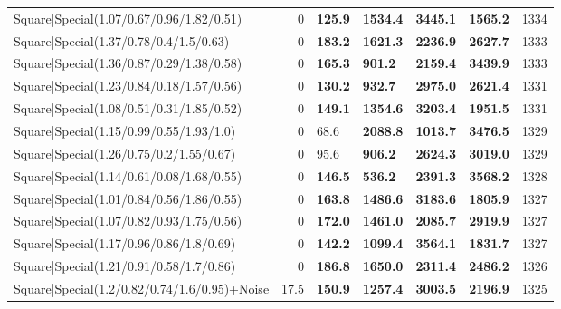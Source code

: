 \begin{tabular}{lrllllr}
 Square|Special(1.07/0.67/0.96/1.82/0.51)                      &             0   & \textbf{125.9} & \textbf{1534.4} & \textbf{3445.1} & \textbf{1565.2} &         1334 \\
 Square|Special(1.37/0.78/0.4/1.5/0.63)                        &             0   & \textbf{183.2} & \textbf{1621.3} & \textbf{2236.9} & \textbf{2627.7} &         1333 \\
 Square|Special(1.36/0.87/0.29/1.38/0.58)                      &             0   & \textbf{165.3} & \textbf{901.2}  & \textbf{2159.4} & \textbf{3439.9} &         1333 \\
 Square|Special(1.23/0.84/0.18/1.57/0.56)                      &             0   & \textbf{130.2} & \textbf{932.7}  & \textbf{2975.0} & \textbf{2621.4} &         1331 \\
 Square|Special(1.08/0.51/0.31/1.85/0.52)                      &             0   & \textbf{149.1} & \textbf{1354.6} & \textbf{3203.4} & \textbf{1951.5} &         1331 \\
 Square|Special(1.15/0.99/0.55/1.93/1.0)                       &             0   & 68.6           & \textbf{2088.8} & \textbf{1013.7} & \textbf{3476.5} &         1329 \\
 Square|Special(1.26/0.75/0.2/1.55/0.67)                       &             0   & 95.6           & \textbf{906.2}  & \textbf{2624.3} & \textbf{3019.0} &         1329 \\
 Square|Special(1.14/0.61/0.08/1.68/0.55)                      &             0   & \textbf{146.5} & \textbf{536.2}  & \textbf{2391.3} & \textbf{3568.2} &         1328 \\
 Square|Special(1.01/0.84/0.56/1.86/0.55)                      &             0   & \textbf{163.8} & \textbf{1486.6} & \textbf{3183.6} & \textbf{1805.9} &         1327 \\
 Square|Special(1.07/0.82/0.93/1.75/0.56)                      &             0   & \textbf{172.0} & \textbf{1461.0} & \textbf{2085.7} & \textbf{2919.9} &         1327 \\
 Square|Special(1.17/0.96/0.86/1.8/0.69)                       &             0   & \textbf{142.2} & \textbf{1099.4} & \textbf{3564.1} & \textbf{1831.7} &         1327 \\
 Square|Special(1.21/0.91/0.58/1.7/0.86)                       &             0   & \textbf{186.8} & \textbf{1650.0} & \textbf{2311.4} & \textbf{2486.2} &         1326 \\
 Square|Special(1.2/0.82/0.74/1.6/0.95)+Noise                  &            17.5 & \textbf{150.9} & \textbf{1257.4} & \textbf{3003.5} & \textbf{2196.9} &         1325 \\

\end{tabular}
